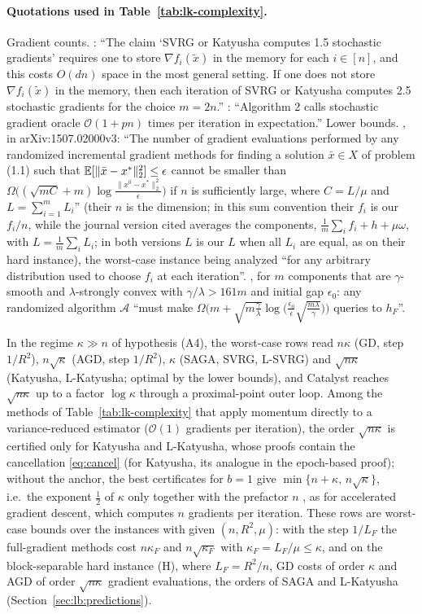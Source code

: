 \paragraph{Quotations used in Table~\ref{tab:lk-complexity}.} Gradient counts. \cite[footnote~11]{allenzhu2018katyusha}: ``The claim `SVRG or Katyusha computes 1.5 stochastic gradients' requires one to store $\nabla f_i(\tilde x)$ in the memory for each $i\in[n]$, and this costs $O(dn)$ space in the most general setting. If one does not store $\nabla f_i(\tilde x)$ in the memory, then each iteration of SVRG or Katyusha computes 2.5 stochastic gradients for the choice $m=2n$.'' \cite[Section~4]{kovalev2020dont}: ``Algorithm 2 calls stochastic gradient oracle $\mathcal O(1+pn)$ times per iteration in expectation.'' Lower bounds. \cite[Corollary~3]{lan2018optimal}, in arXiv:1507.02000v3: ``The number of gradient evaluations performed by any randomized incremental gradient methods for finding a solution $\bar x\in X$ of problem (1.1) such that $\mathbb{E}[\|\bar x-x^\ast\|_2^2]\le\epsilon$ cannot be smaller than $\Omega\big((\sqrt{mC}+m)\log\frac{\|x^0-x^\ast\|_2^2}{\epsilon}\big)$ if $n$ is sufficiently large, where $C=L/\mu$ and $L=\sum_{i=1}^mL_i$'' (their $n$ is the dimension; in this sum convention their $f_i$ is our $f_i/n$, while the journal version cited averages the components, $\frac1m\sum_if_i+h+\mu\omega$, with $L=\frac1m\sum_iL_i$; in both versions $L$ is our $L$ when all $L_i$ are equal, as on their hard instance), the worst-case instance being analyzed ``for any arbitrary distribution used to choose $f_i$ at each iteration''. \cite[Theorem~8]{woodworth2016tight}, for $m$ components that are $\gamma$-smooth and $\lambda$-strongly convex with $\gamma/\lambda>161m$ and initial gap $\epsilon_0$: any randomized algorithm $\mathcal A$ ``must make $\Omega\big(m+\sqrt{m\frac\gamma\lambda}\log\big(\frac{\epsilon_0}{\epsilon}\sqrt{\frac{m\lambda}{\gamma}}\big)\big)$ queries to $h_F$''.

In the regime $\kappa\gg n$ of hypothesis (A4), the worst-case rows read $n\kappa$ (GD, step $1/R^2$), $n\sqrt\kappa$ (AGD, step $1/R^2$), $\kappa$ (SAGA, SVRG, L-SVRG) and $\sqrt{n\kappa}$ (Katyusha, L-Katyusha; optimal by the lower bounds), and Catalyst reaches $\sqrt{n\kappa}$ up to a factor $\log\kappa$ through a proximal-point outer loop. Among the methods of Table~\ref{tab:lk-complexity} that apply momentum directly to a variance-reduced estimator ($\mathcal O(1)$ gradients per iteration), the order $\sqrt{n\kappa}$ is certified only for Katyusha and L-Katyusha, whose proofs contain the cancellation \eqref{eq:cancel} (for Katyusha, its analogue in the epoch-based proof); without the anchor, the best certificates for $b=1$ give $\min\{n+\kappa,\,n\sqrt\kappa\}$, i.e.\ the exponent $\frac12$ of $\kappa$ only together with the prefactor $n$ \cite{driggs2022accelerating}, as for accelerated gradient descent, which computes $n$ gradients per iteration. These rows are worst-case bounds over the instances with given $(n,R^2,\mu)$: with the step $1/L_F$ the full-gradient methods cost $n\kappa_F$ and $n\sqrt{\kappa_F}$ with $\kappa_F=L_F/\mu\le\kappa$, and on the block-separable hard instance (H), where $L_F=R^2/n$, GD costs of order $\kappa$ and AGD of order $\sqrt{n\kappa}$ gradient evaluations, the orders of SAGA and L-Katyusha (Section~\ref{sec:lb:predictions}).
